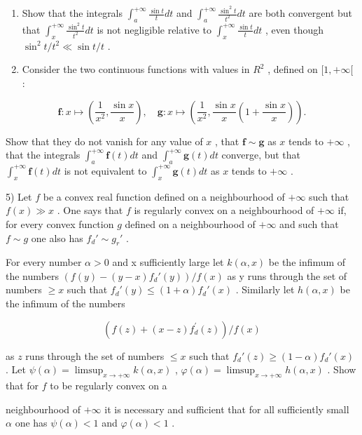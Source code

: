 \begin{enumerate}
\def\labelenumi{\alph{enumi})}
\setcounter{enumi}{1}
\item
  Show that the integrals \(\int_{a}^{+\infty}\frac{\sin t}{t}dt\) and \(\int_{a}^{+\infty}\frac{\sin^{2}t}{t^{2}}dt\) are both convergent but that \(\int_{x}^{+\infty}\frac{\sin^{2}t}{t^{2}}dt\) is not negligible relative to \(\int_{x}^{+\infty}\frac{\sin t}{t}dt\) , even though \(\sin^{2}t/t^{2}\ll\sin t/t\) .
\item
  Consider the two continuous functions with values in \(R^{2}\) , defined on \([1, +\infty[\) :
\end{enumerate}

\[
\mathbf {f}: x \mapsto \left(\frac {1}{x ^ {2}}, \frac {\sin x}{x}\right), \quad \mathbf {g}: x \mapsto \left(\frac {1}{x ^ {2}}, \frac {\sin x}{x} \left(1 + \frac {\sin x}{x}\right)\right).
\]

Show that they do not vanish for any value of \(x\) , that \(\mathbf{f} \sim \mathbf{g}\) as \(x\) tends to \(+\infty\) , that the integrals \(\int_{a}^{+\infty} \mathbf{f}(t) dt\) and \(\int_{a}^{+\infty} \mathbf{g}(t) dt\) converge, but that \(\int_{x}^{+\infty} \mathbf{f}(t) dt\) is not equivalent to \(\int_{x}^{+\infty} \mathbf{g}(t) dt\) as \(x\) tends to \(+\infty\) .

5) Let \(f\) be a convex real function defined on a neighbourhood of \(+\infty\) such that \(f(x) \gg x\) . One says that \(f\) is regularly convex on a neighbourhood of \(+\infty\) if, for every convex function \(g\) defined on a neighbourhood of \(+\infty\) and such that \(f \sim g\) one also has \(f_d' \sim g_r'\) .

For every number \(\alpha > 0\) and x sufficiently large let \(k(\alpha, x)\) be the infimum of the numbers \(\left(f(y) - (y - x)f_{d}'(y)\right)/f(x)\) as y runs through the set of numbers \(\geqslant x\) such that \(f_{d}'(y) \leqslant (1 + \alpha)f_{d}'(x)\) . Similarly let \(h(\alpha, x)\) be the infimum of the numbers

\[
\left(f (z) + (x - z) f _ {d} ^ {\prime} (z)\right) / f (x)
\]

as \(z\) runs through the set of numbers \(\leqslant x\) such that \(f_d'(z) \geqslant (1 - \alpha)f_d'(x)\) . Let \(\psi(\alpha) = \limsup_{x \to +\infty} k(\alpha, x)\) , \(\varphi(\alpha) = \limsup_{x \to +\infty} h(\alpha, x)\) . Show that for \(f\) to be regularly convex on a

neighbourhood of \(+\infty\) it is necessary and sufficient that for all sufficiently small \(\alpha\) one has \(\psi(\alpha) < 1\) and \(\varphi(\alpha) < 1\) .

